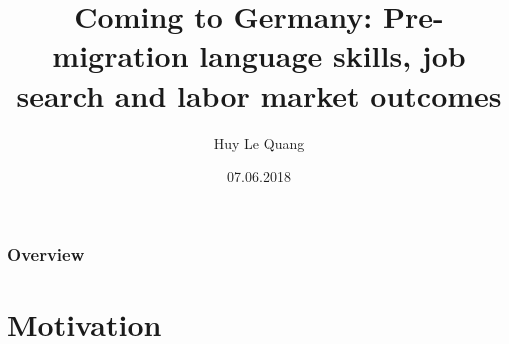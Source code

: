\documentclass{beamer}
\title[]{Coming to Germany: Pre-migration language skills, job search and labor market outcomes} %
\author{Huy Le Quang} %
\institute[] %
{University of Bamberg\\ %
\medskip
\large{BGPE Research Workshop}} %
\date{07.06.2018} %
\begin{document}
\begin{frame}
\titlepage %
\end{frame}

\begin{frame}
\frametitle{Overview} %
\tableofcontents %
\end{frame}


\section{Motivation} %
\end{document}
